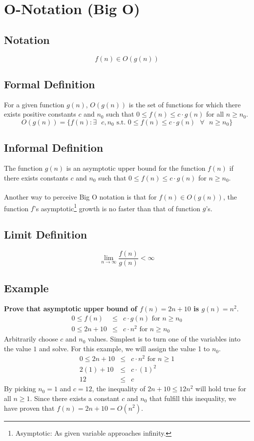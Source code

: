 \section{O-Notation (Big O)}

\subsection*{Notation}
$$f(n) \in O(g(n))$$

\subsection*{Formal Definition}
For a given function $g(n)$, $O(g(n))$ is the set of functions for which there exists positive constants $c$ and $n_0$ such that $0 \leq f(n) \leq c \cdot g(n)$ for all $n \geq n_0$.
$$
O(g(n)) = \{ f(n) : \exists \text{ } c, n_0 \text{ s.t. } 0 \leq f(n) \leq c \cdot g(n) \text{ } \forall \text{ } n \geq n_0 \}
$$

\subsection*{Informal Definition}
The function $g(n)$ is an asymptotic upper bound for the function $f(n)$ if there exists constants $c$ and $n_0$ such that $0 \leq f(n) \leq c \cdot g(n)$ for $n \geq n_0$.\\\\
Another way to perceive Big O notation is that for $f(n) \in O(g(n))$, the function $f$'s asymptotic\footnote{Asymptotic: As given variable approaches infinity.} growth is no faster than that of function $g$'s.

\subsection*{Limit Definition}
$$ 
\lim\limits_{n \to \infty} \frac{f(n)}{g(n)} < \infty
$$

\subsection{Example}
\textbf{Prove that asymptotic upper bound of $f(n) = 2n+10$ is $g(n) = n^2$}.
\begin{eqnarray*}
	0 \leq f(n) &\leq& c \cdot g(n) \text{ for } n \geq n_0\\
	0 \leq 2n + 10 &\leq& c \cdot n^2 \text{ for } n \geq n_0
\end{eqnarray*}
Arbitrarily choose $c$ and $n_0$ values. Simplest is to turn one of the variables into the value $1$ and solve. For this example, we will assign the value 1 to $n_0$.
\begin{eqnarray*}
	0 \leq 2n + 10 &\leq& c \cdot n^2 \text{ for } n \geq 1\\
	2(1) + 10 &\leq& c \cdot (1)^2\\
	12 &\leq& c
\end{eqnarray*}
By picking $n_0 = 1$ and $c = 12$, the inequality of $2n+10 \leq 12n^2$ will hold true for all $n \geq 1$. Since there exists a constant $c$ and $n_0$ that fulfill this inequality, we have proven that $f(n) = 2n+10 = O(n^2)$.